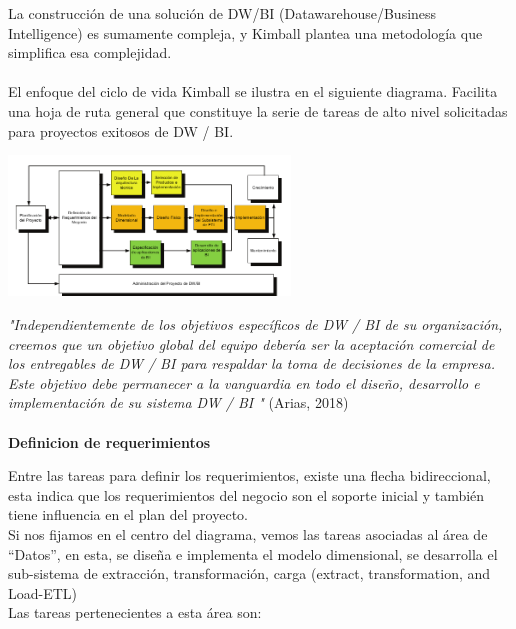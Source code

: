 \documentclass[twoside,twocolumn]{article}
\begin{document}
\begin{enumerate}
\begin{itemize}
\end{itemize}
La construcción de una solución de DW/BI (Datawarehouse/Business Intelligence) es sumamente compleja, y Kimball plantea una metodología que simplifica esa complejidad. \\ \\
El enfoque del ciclo de vida Kimball se ilustra en el siguiente diagrama. Facilita una hoja de ruta general que constituye la serie de tareas de alto nivel solicitadas para proyectos exitosos de DW / BI.


\includegraphics[width=7.5cm]{Imagenes/Kimboll2}

\textit{"Independientemente de los objetivos específicos de DW / BI de su organización, creemos que un objetivo global del equipo debería ser la aceptación comercial de los entregables de DW / BI para respaldar la toma de decisiones de la empresa. Este objetivo debe permanecer a la vanguardia en todo el diseño, desarrollo e implementación de su sistema DW / BI "} (Arias, 2018)
\\ \\


\textbf{Definicion de requerimientos}

Entre las tareas para definir los requerimientos, existe una flecha bidireccional, esta indica que los requerimientos del negocio son el soporte inicial y también tiene influencia en el plan del proyecto.\\

Si nos fijamos en el centro del diagrama, vemos las tareas asociadas al área de “Datos”, en esta, se diseña e implementa el modelo dimensional, se desarrolla el sub-sistema de extracción, transformación, carga (extract, transformation, and Load-ETL) \\

Las tareas pertenecientes a esta área son:


\end{enumerate}
\end{document}
